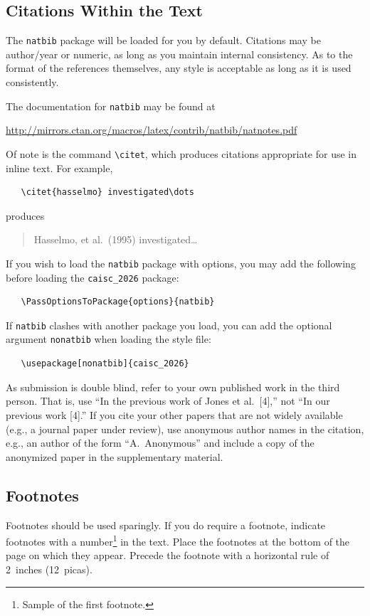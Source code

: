 \documentclass{article}
\begin{document}
\subsection{Citations Within the Text}

The \verb+natbib+ package will be loaded for you by default.  Citations may be author/year or numeric, as long as you maintain internal consistency.  As to the format of the references themselves, any style is acceptable as long as it is used consistently.

The documentation for \verb+natbib+ may be found at
\begin{center}
  \url{http://mirrors.ctan.org/macros/latex/contrib/natbib/natnotes.pdf}
\end{center}
Of note is the command \verb+\citet+, which produces citations appropriate for use in inline text. For example,
\begin{verbatim}
   \citet{hasselmo} investigated\dots
\end{verbatim}
produces
\begin{quote}
  Hasselmo, et al.\ (1995) investigated\dots
\end{quote}

If you wish to load the \verb+natbib+ package with options, you may add the following before loading the \verb+caisc_2026+ package:
\begin{verbatim}
   \PassOptionsToPackage{options}{natbib}
\end{verbatim}

If \verb+natbib+ clashes with another package you load, you can add the optional argument \verb+nonatbib+ when loading the style file:
\begin{verbatim}
   \usepackage[nonatbib]{caisc_2026}
\end{verbatim}

As submission is double blind, refer to your own published work in the third person. That is, use ``In the previous work of Jones et al.\ [4],'' not ``In our previous work [4].'' If you cite your other papers that are not widely available
(e.g., a journal paper under review), use anonymous author names in the citation, e.g., an author of the form ``A.\ Anonymous'' and include a copy of the anonymized paper in the supplementary material.

\subsection{Footnotes}

Footnotes should be used sparingly.  If you do require a footnote, indicate footnotes with a number\footnote{Sample of the first footnote.} in the text. Place the footnotes at the bottom of the page on which they appear. Precede the footnote with a horizontal rule of 2~inches (12~picas).
\end{document}
